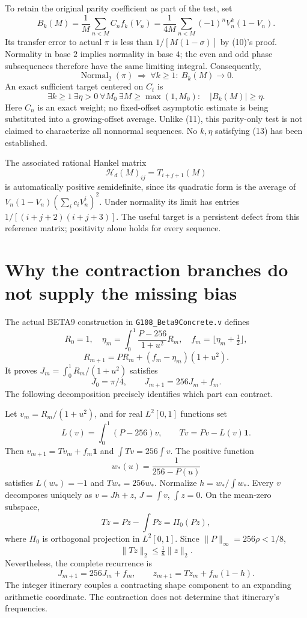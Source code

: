 \documentclass[10pt,a4paper]{article}
\newcommand{\Normal}{\operatorname{Normal}_2}
\newcommand{\av}[2]{\frac1{#1}\sum_{n<#1}#2}
\begin{document}
To retain the original parity coefficient as part of the test, set
\[
 \boxed{B_k(M)=\av{M}{C_n f_k(V_n)}
       =\frac1{4M}\sum_{n<M}(-1)^nV_n^k(1-V_n).}             \tag{12}
\]
Its transfer error to actual $\pi$ is less than $1/[M(1-\sigma)]$ by (10)'s proof. Normality in base $2$ implies normality in base $4$; the even and odd phase subsequences therefore have the same limiting integral. Consequently,
\[
 \Normal(\pi)\ \Longrightarrow\ \forall k\ge1:\ B_k(M)\longrightarrow0.
\]
An exact sufficient target centered on $C_t$ is
\[
 \boxed{\exists k\ge1\ \exists\eta>0\ \forall M_0\ \exists M\ge\max(1,M_0):
 \quad |B_k(M)|\ge\eta.}                                     \tag{13}
\]
Here $C_n$ is an exact weight; no fixed-offset asymptotic estimate is being substituted into a growing-offset average. Unlike (11), this parity-only test is not claimed to characterize all nonnormal sequences. No $k,\eta$ satisfying (13) has been established.

The associated rational Hankel matrix
\[
 \mathcal H_d(M)_{ij}=T_{i+j+1}(M)
\]
is automatically positive semidefinite, since its quadratic form is the average of
$V_n(1-V_n)(\sum_i c_iV_n^i)^2$. Under normality its limit has entries
$1/[(i+j+2)(i+j+3)]$. The useful target is a persistent defect from this reference matrix; positivity alone holds for every sequence.

\newpage
\section{Why the contraction branches do not supply the missing bias}
The actual BETA9 construction in \texttt{G108\_Beta9Concrete.v} defines
\[
 R_0=1,\quad \eta_m=\int_0^1\frac{P-256}{1+u^2}R_m,\quad
 f_m=\lfloor\eta_m+\tfrac12\rfloor,
\]
\[
 R_{m+1}=PR_m+(f_m-\eta_m)(1+u^2).
\]
It proves $J_m=\int_0^1R_m/(1+u^2)$ satisfies
\[
 J_0=\pi/4,\qquad J_{m+1}=256J_m+f_m.
\]
The following decomposition precisely identifies which part can contract.

Let $v_m=R_m/(1+u^2)$, and for real $L^2[0,1]$ functions set
\[
 L(v)=\int_0^1(P-256)v,\qquad Tv=Pv-L(v)\mathbf1.
\]
Then $v_{m+1}=Tv_m+f_m\mathbf1$ and $\int Tv=256\int v$.
The positive function
\[
 w_*(u)=\frac1{256-P(u)}
\]
satisfies $L(w_*)=-1$ and $Tw_*=256w_*$. Normalize $h=w_*/\int w_*$.
Every $v$ decomposes uniquely as $v=Jh+z$, $J=\int v$, $\int z=0$.
On the mean-zero subspace,
\[
 Tz=Pz-\int Pz=\Pi_0(Pz),
\]
where $\Pi_0$ is orthogonal projection in $L^2[0,1]$. Since
$\|P\|_\infty=256\rho<1/8$,
\[
 \boxed{\|Tz\|_2\le\tfrac18\|z\|_2.}                      \tag{14}
\]
Nevertheless, the complete recurrence is
\[
 \boxed{J_{m+1}=256J_m+f_m,\qquad
 z_{m+1}=Tz_m+f_m(1-h).}                                    \tag{15}
\]
The integer itinerary couples a contracting shape component to an expanding arithmetic coordinate. The contraction does not determine that itinerary's frequencies.
\end{document}
